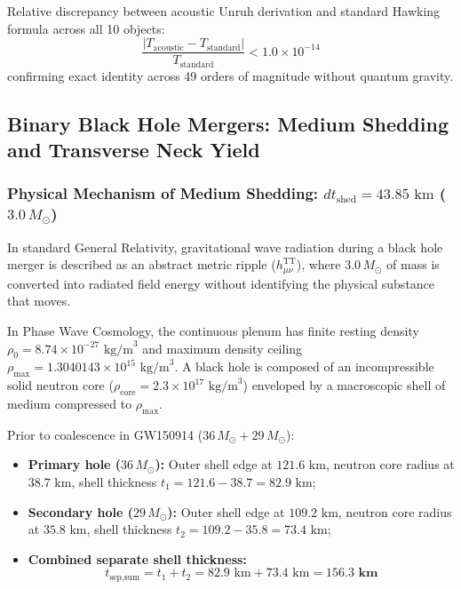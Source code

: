 \documentclass[11pt,a4paper]{article}
\begin{document}
Relative discrepancy between acoustic Unruh derivation and standard Hawking formula across all 10 objects:
\begin{equation}
\frac{|T_{\text{acoustic}} - T_{\text{standard}}|}{T_{\text{standard}}} < 1.0 \times 10^{-14}
\end{equation}
confirming exact identity across 49 orders of magnitude without quantum gravity.

\subsection{Binary Black Hole Mergers: Medium Shedding and Transverse Neck Yield}
\label{subsec:merger_neck_yield}

\subsubsection{Physical Mechanism of Medium Shedding: $dt_{\text{shed}} = 43.85\text{ km}$ ($3.0\,M_\odot$)}
\label{subsubsec:medium_shedding}

In standard General Relativity, gravitational wave radiation during a black hole merger is described as an abstract metric ripple ($h_{\mu\nu}^{\text{TT}}$), where $3.0\,M_\odot$ of mass is converted into radiated field energy without identifying the physical substance that moves.

In Phase Wave Cosmology, the continuous plenum has finite resting density $\rho_0 = 8.74 \times 10^{-27}\text{ kg/m}^3$ and maximum density ceiling $\rho_{\max} = 1.3040143 \times 10^{15}\text{ kg/m}^3$. A black hole is composed of an incompressible solid neutron core ($\rho_{\text{core}} = 2.3 \times 10^{17}\text{ kg/m}^3$) enveloped by a macroscopic shell of medium compressed to $\rho_{\max}$.

Prior to coalescence in GW150914 ($36\,M_\odot + 29\,M_\odot$):
\begin{itemize}
    \item \textbf{Primary hole ($36\,M_\odot$):} Outer shell edge at $121.6\text{ km}$, neutron core radius at $38.7\text{ km}$, shell thickness $t_1 = 121.6 - 38.7 = 82.9\text{ km}$;
    \item \textbf{Secondary hole ($29\,M_\odot$):} Outer shell edge at $109.2\text{ km}$, neutron core radius at $35.8\text{ km}$, shell thickness $t_2 = 109.2 - 35.8 = 73.4\text{ km}$;
    \item \textbf{Combined separate shell thickness:}
    \begin{equation}
    t_{\text{sep,sum}} = t_1 + t_2 = 82.9\text{ km} + 73.4\text{ km} = \mathbf{156.3\text{ km}}
    \end{equation}
\end{itemize}
\end{document}
